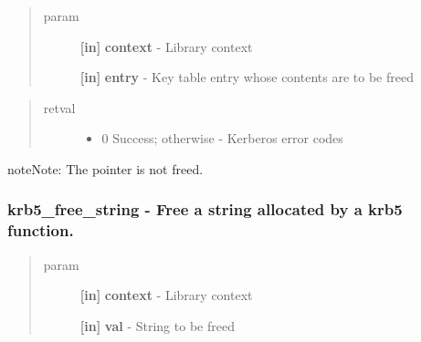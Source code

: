 \documentclass[letterpaper,10pt,english]{sphinxmanual}
\begin{document}
\begin{quote}\begin{description}
\item[{param}] \leavevmode
\textbf{{[}in{]}} \textbf{context} - Library context

\textbf{{[}in{]}} \textbf{entry} - Key table entry whose contents are to be freed

\end{description}\end{quote}
\begin{quote}\begin{description}
\item[{retval}] \leavevmode\begin{itemize}
\item {} 
0   Success; otherwise - Kerberos error codes

\end{itemize}

\end{description}\end{quote}

\begin{notice}{note}{Note:}
The pointer is not freed.
\end{notice}


\subsubsection{krb5\_free\_string -  Free a string allocated by a krb5 function.}
\label{appdev/refs/api/krb5_free_string:krb5-free-string-free-a-string-allocated-by-a-krb5-function}\label{appdev/refs/api/krb5_free_string::doc}

\begin{fulllineitems}
\label{appdev/refs/api/krb5_free_string:krb5_free_string}
\end{fulllineitems}

\begin{quote}\begin{description}
\item[{param}] \leavevmode
\textbf{{[}in{]}} \textbf{context} - Library context

\textbf{{[}in{]}} \textbf{val} - String to be freed

\end{description}\end{quote}
\end{document}
